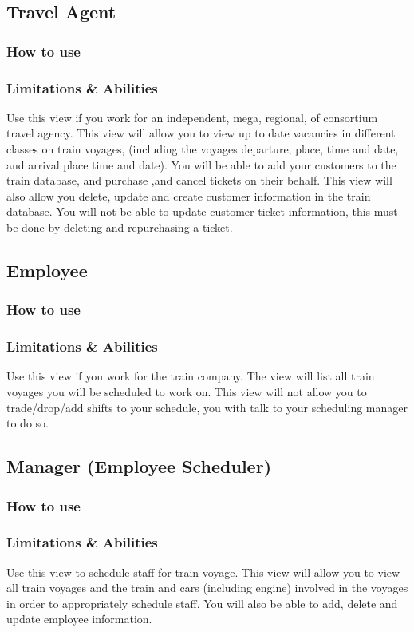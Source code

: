 \documentclass[letter]{article}
\begin{document}
\subsection{Travel Agent}
\subsubsection{How to use}

\subsubsection{Limitations \& Abilities}
Use this view if you work for an independent, mega, regional, of consortium travel agency. This view will allow you to view up to date vacancies in different classes on train voyages, (including the voyages departure, place, time and date, and arrival place time and date).  You will be able to add your customers to the train database, and purchase ,and cancel tickets on their behalf. This view will also allow you delete, update and create customer information in the train database. You will not be able to update customer ticket information, this must be done by deleting and repurchasing a ticket. 


\subsection{Employee}
\subsubsection{How to use}

\subsubsection{Limitations \& Abilities}
Use this view if you work for the train company. The view will list all train voyages you will be scheduled to work on.  This view will not allow you to trade/drop/add shifts to your schedule, you with talk to your scheduling manager  to do so.


\subsection{Manager (Employee Scheduler)}
\subsubsection{How to use}

\subsubsection{Limitations \& Abilities}
Use this view to schedule staff for train voyage. This view will allow you to view all train voyages and the train and cars (including engine) involved in the voyages in order to appropriately schedule staff. You will also be able to add, delete and update employee information.
\end{document}

